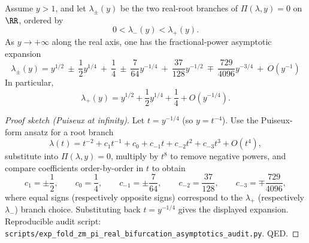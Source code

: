 \begin{conclusion}\label{con:xi-terminal-zm-pi-positive-real-branch-puiseux-infty}
Assume \(y>1\), and let \(\lambda_{\pm}(y)\) be the two real-root branches of \(\Pi(\lambda,y)=0\) on \(\RR\), ordered by
\[
0<\lambda_{-}(y)<\lambda_{+}(y).
\]
As \(y\to +\infty\) along the real axis, one has the fractional-power asymptotic expansion
\[
\boxed{\;
\lambda_{\pm}(y)
= y^{1/2}\ \pm\ \frac{1}{2}y^{1/4}\ +\ \frac{1}{4}\ \pm\ \frac{7}{64}y^{-1/4}\ +\ \frac{37}{128}y^{-1/2}\ \mp\ \frac{729}{4096}y^{-3/4}\ +\ O(y^{-1})\;}
\]
In particular,
\[
\lambda_{+}(y)=y^{1/2}+\frac12 y^{1/4}+\frac14+O(y^{-1/4}).
\]
\end{conclusion}
\begin{proof}[Proof sketch (Puiseux at infinity)]
Let \(t=y^{-1/4}\) (so \(y=t^{-4}\)).
Use the Puiseux-form ansatz for a root branch
\[
\lambda(t)=t^{-2}+c_{1}t^{-1}+c_{0}+c_{-1}t+c_{-2}t^{2}+c_{-3}t^{3}+O(t^{4}),
\]
substitute into \(\Pi(\lambda,y)=0\), multiply by \(t^{8}\) to remove negative powers, and compare coefficients order-by-order in \(t\) to obtain
\[
c_{1}=\pm\frac12,\qquad c_{0}=\frac14,\qquad c_{-1}=\pm\frac{7}{64},\qquad c_{-2}=\frac{37}{128},\qquad c_{-3}=\mp\frac{729}{4096},
\]
where equal signs (respectively opposite signs) correspond to the \(\lambda_{+}\) (respectively \(\lambda_{-}\)) branch choice.
Substituting back \(t=y^{-1/4}\) gives the displayed expansion.
Reproducible audit script: \texttt{scripts/exp\_fold\_zm\_pi\_real\_bifurcation\_asymptotics\_audit.py}. QED.
\end{proof}

